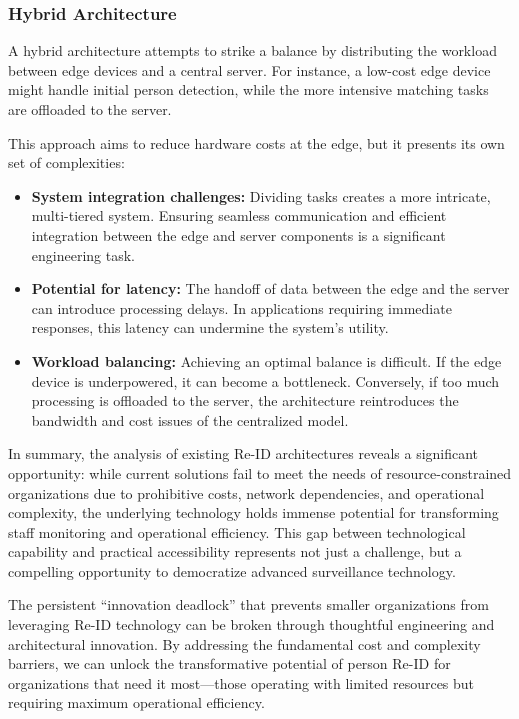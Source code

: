 \documentclass[../main.tex]{subfiles}
\begin{document}
\subsubsection{Hybrid Architecture}
A hybrid architecture attempts to strike a balance by distributing the workload between edge devices and a central server. For instance, a low-cost edge device might handle initial person detection, while the more intensive matching tasks are offloaded to the server.

This approach aims to reduce hardware costs at the edge, but it presents its own set of complexities:
\begin{itemize}
    \item \textbf{System integration challenges:} Dividing tasks creates a more intricate, multi-tiered system. Ensuring seamless communication and efficient integration between the edge and server components is a significant engineering task.
    \item \textbf{Potential for latency:} The handoff of data between the edge and the server can introduce processing delays. In applications requiring immediate responses, this latency can undermine the system's utility.
    \item \textbf{Workload balancing:} Achieving an optimal balance is difficult. If the edge device is underpowered, it can become a bottleneck. Conversely, if too much processing is offloaded to the server, the architecture reintroduces the bandwidth and cost issues of the centralized model.
\end{itemize}

In summary, the analysis of existing Re-ID architectures reveals a significant opportunity: while current solutions fail to meet the needs of resource-constrained organizations due to prohibitive costs, network dependencies, and operational complexity, the underlying technology holds immense potential for transforming staff monitoring and operational efficiency. This gap between technological capability and practical accessibility represents not just a challenge, but a compelling opportunity to democratize advanced surveillance technology.

The persistent ``innovation deadlock'' that prevents smaller organizations from leveraging Re-ID technology can be broken through thoughtful engineering and architectural innovation. By addressing the fundamental cost and complexity barriers, we can unlock the transformative potential of person Re-ID for organizations that need it most—those operating with limited resources but requiring maximum operational efficiency.
\end{document}
